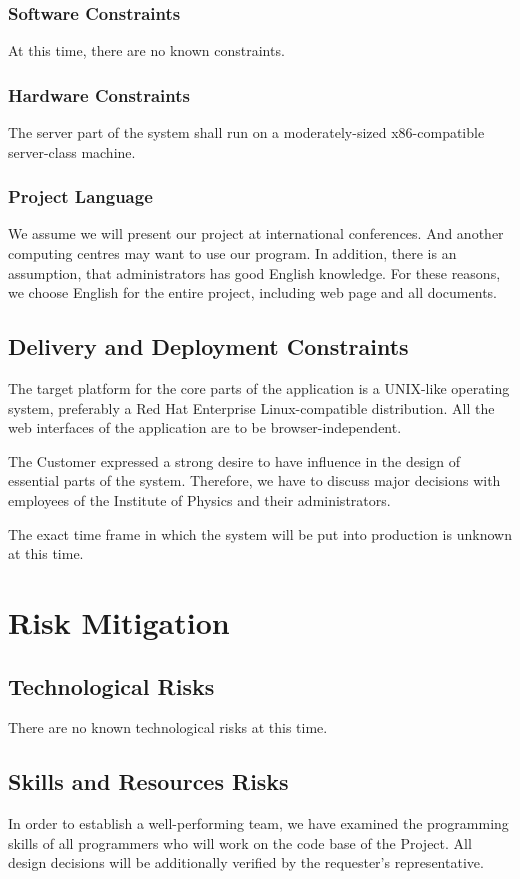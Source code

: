 \documentclass[12pt]{article}
\begin{document}
\subsubsection{Software Constraints}
At this time, there are no known constraints.

\subsubsection{Hardware Constraints}
The server part of the system shall run on a moderately-sized x86-compatible
server-class machine.

\subsubsection{Project Language}
We assume we will present our project at international conferences. And another computing centres
may want to use our program. In addition, there is an assumption, that administrators has good
English knowledge. For these reasons, we choose English for the entire project, including web page
and all documents.


\subsection{Delivery and Deployment Constraints}
The target platform for the core parts of the application is a UNIX-like
operating system, preferably a Red Hat Enterprise Linux-compatible distribution.
All the web interfaces of the application are to be browser-independent.

The Customer expressed a strong desire to have influence in the design of
essential parts of the system.   Therefore, we have to discuss major decisions
with employees of the Institute of Physics and their administrators.

The exact time frame in which the system will be put into production is unknown
at this time.

\section{Risk Mitigation}

\subsection{Technological Risks}
There are no known technological risks at this time.

\subsection{Skills and Resources Risks}
In order to establish a well-performing team, we have examined the programming
skills of all programmers who will work on the code base of the Project.  All
design decisions will be additionally verified by the requester's
representative.
\end{document}
